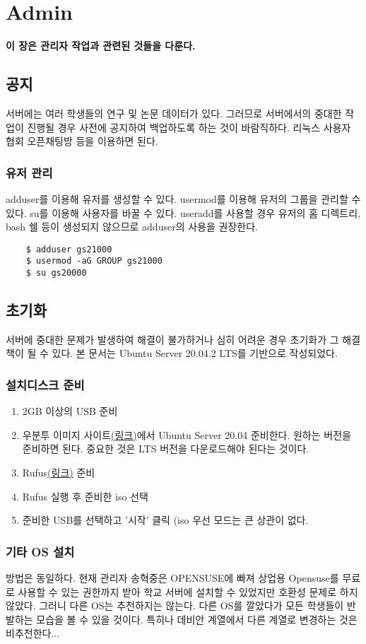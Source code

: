 \graphicspath{{./chap6/images/}}  
\chapter{Admin}
\textbf{이 장은 관리자 작업과 관련된 것들을 다룬다.}

\section{공지}
서버에는 여러 학생들의 연구 및 논문 데이터가 있다. 그러므로 서버에서의 중대한 작업이 진행될 경우 사전에 공지하여 백업하도록 하는 것이 바람직하다. 리눅스 사용자 협회 오픈채팅방 등을 이용하면 된다.
\subsection{유저 관리}
adduser를 이용해 유저를 생성할 수 있다. usermod를 이용해 유저의 그룹을 관리할 수 있다. su를 이용해 사용자를 바꿀 수 있다. useradd를 사용할 경우 유저의 홈 디렉트리, bash 쉘 등이 생성되지 않으므로 adduser의 사용을 권장한다.
    \begin{lstlisting}
    $ adduser gs21000
    $ usermod -aG GROUP gs21000
    $ su gs20000
    \end{lstlisting}
\section{초기화}
서버에 중대한 문제가 발생하여 해결이 불가하거나 심히 어려운 경우 초기화가 그 해결책이 될 수 있다. 본 문서는 Ubuntu Server 20.04.2 LTS를 기반으로 작성되었다.
\subsection{설치디스크 준비}
\begin{enumerate}
    \item 2GB 이상의 USB 준비
    \item 우분투 이미지 사이트\href{https://releases.ubuntu.com/20.04/}{(링크)}에서 Ubuntu Server 20.04 준비한다. 원하는 버전을 준비하면 된다. 중요한 것은 LTS 버전을 다운로드해야 된다는 것이다. 
    \item Rufus\href{https://rufus.ie/}{(링크)} 준비
    \item Rufus 실행 후 준비한 iso 선택
    \item 준비한 USB를 선택하고 '시작' 클릭 (iso 우선 모드는 큰 상관이 없다. 
\end{enumerate}
\subsection{기타 OS 설치}
방법은 동일하다. 현재 관리자 송혁중은 OPENSUSE에 빠져 상업용 Opensuse를 무료로 사용할 수 있는 권한까지 받아 학교 서버에 설치할 수 있었지만 호환성 문제로 하지 않았다. 그러니 다른 OS는 추천하지는 않는다. 다른 OS를 깔았다가 모든 학생들이 반발하는 모습을 볼 수 있을 것이다. 특히나 데비안 계열에서 다른 계열로 변경하는 것은 비추천한다...
